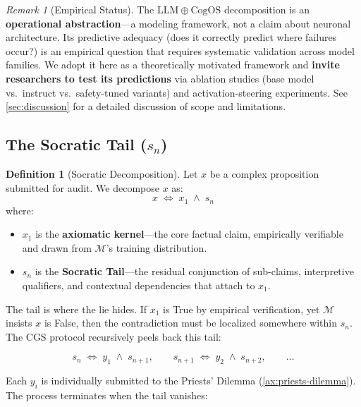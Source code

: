 \documentclass[11pt,a4paper]{article}
\theoremstyle{definition}
\newtheorem{definition}{Definition}[section]
\theoremstyle{plain}
\theoremstyle{remark}
\newtheorem{remark}{Remark}[section]
\begin{document}
\begin{remark}[Empirical Status]
The $\mathrm{LLM} \oplus \mathrm{CogOS}$ decomposition is an \textbf{operational abstraction}---a modeling framework, not a claim about neuronal architecture. Its predictive adequacy (does it correctly predict where failures occur?) is an empirical question that requires systematic validation across model families. We adopt it here as a theoretically motivated framework and \textbf{invite researchers to test its predictions} via ablation studies (base model vs.\ instruct vs.\ safety-tuned variants) and activation-steering experiments. See \cref{sec:discussion} for a detailed discussion of scope and limitations.
\end{remark}


\subsection{The Socratic Tail ($s_n$)}\label{subsec:tail}

\begin{definition}[Socratic Decomposition]\label{def:socratic}
Let $x$ be a complex proposition submitted for audit. We decompose $x$ as:
\begin{equation}\label{eq:decomp}
  x \;\iff\; x_1 \;\wedge\; s_n
\end{equation}
where:
\begin{itemize}[itemsep=3pt]
  \item $x_1$ is the \textbf{axiomatic kernel}---the core factual claim, empirically verifiable and drawn from $\mathcal{M}$'s training distribution.
  \item $s_n$ is the \textbf{Socratic Tail}---the residual conjunction of sub-claims, interpretive qualifiers, and contextual dependencies that attach to $x_1$.
\end{itemize}
\end{definition}

The tail is where the lie hides. If $x_1$ is True by empirical verification, yet $\mathcal{M}$ insists $x$ is False, then the contradiction must be localized somewhere within $s_n$. The CGS protocol recursively peels back this tail:

\begin{equation}\label{eq:recursive-tail}
  s_n \;\iff\; y_1 \;\wedge\; s_{n+1},
  \qquad
  s_{n+1} \;\iff\; y_2 \;\wedge\; s_{n+2},
  \qquad
  \ldots
\end{equation}

Each $y_i$ is individually submitted to the Priests' Dilemma (\cref{ax:priests-dilemma}). The process terminates when the tail vanishes:
\end{document}
